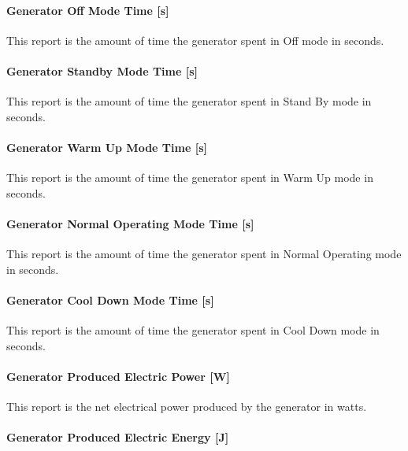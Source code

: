 \paragraph{Generator Off Mode Time {[}s{]}}\label{generator-off-mode-time-s}

This report is the amount of time the generator spent in Off mode in seconds.

\paragraph{Generator Standby Mode Time {[}s{]}}\label{generator-standby-mode-time-s}

This report is the amount of time the generator spent in Stand By mode in seconds.

\paragraph{Generator Warm Up Mode Time {[}s{]}}\label{generator-warm-up-mode-time-s}

This report is the amount of time the generator spent in Warm Up mode in seconds.

\paragraph{Generator Normal Operating Mode Time {[}s{]}}\label{generator-normal-operating-mode-time-s}

This report is the amount of time the generator spent in Normal Operating mode in seconds.

\paragraph{Generator Cool Down Mode Time {[}s{]}}\label{generator-cool-down-mode-time-s}

This report is the amount of time the generator spent in Cool Down mode in seconds.

\paragraph{Generator Produced Electric Power {[}W{]}}\label{generator-produced-electric-power-w-2}

This report is the net electrical power produced by the generator in watts.

\paragraph{Generator Produced Electric Energy {[}J{]}}\label{generator-produced-electric-energy-j-2}

